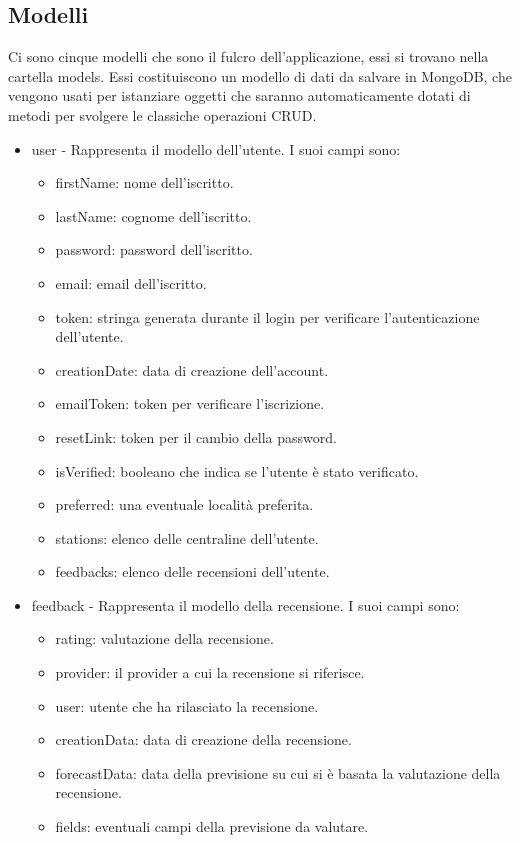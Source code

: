 \subsection{Modelli}
Ci sono cinque modelli
che sono il fulcro dell'applicazione, essi si trovano nella cartella models. Essi costituiscono un modello di dati da salvare in MongoDB, che vengono usati per istanziare oggetti che saranno automaticamente dotati di metodi per svolgere le classiche operazioni CRUD.
\begin{itemize}
\item user - Rappresenta il modello dell'utente. I suoi campi sono:
\begin{itemize}
\item firstName: nome dell'iscritto.
\item lastName: cognome dell'iscritto.
\item password: password dell'iscritto.
\item email: email dell'iscritto.
\item token: stringa generata durante il login per verificare l'autenticazione dell'utente.
\item creationDate: data di creazione dell'account.
\item emailToken: token per verificare l'iscrizione.
\item resetLink: token per il cambio della password.
\item isVerified: booleano che indica se l'utente è stato verificato.
\item preferred: una eventuale località preferita.
\item stations: elenco delle centraline dell'utente.
\item feedbacks: elenco delle recensioni dell'utente.
\end{itemize}
\item feedback - Rappresenta il modello della recensione. I suoi campi sono: 
\begin{itemize}
    \item rating: valutazione della recensione. 
    \item provider: il provider a cui la recensione si riferisce.
    \item user: utente che ha rilasciato la recensione.
    \item creationData: data di creazione della recensione.
    \item forecastData: data della previsione su cui si è basata la valutazione della recensione.
    \item fields: eventuali campi della previsione da valutare.

\end{itemize}
\end{itemize}
